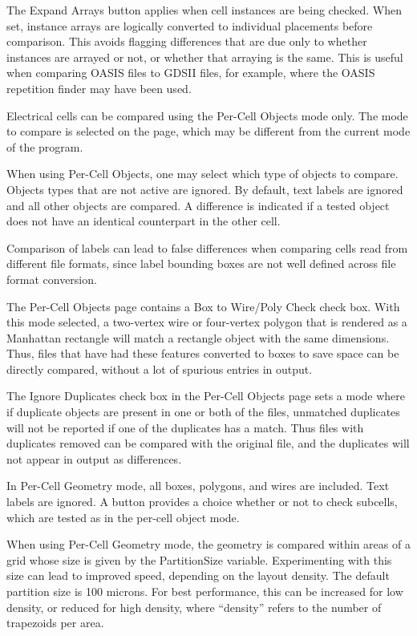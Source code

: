 The {\cb Expand Arrays} button applies when cell instances are being
checked.  When set, instance arrays are logically converted to
individual placements before comparison.  This avoids flagging
differences that are due only to whether instances are arrayed or not,
or whether that arraying is the same.  This is useful when comparing
OASIS files to GDSII files, for example, where the OASIS repetition
finder may have been used.

Electrical cells can be compared using the {\cb Per-Cell Objects} mode
only.  The mode to compare is selected on the page, which may be
different from the current mode of the program.

When using {\cb Per-Cell Objects}, one may select which type of
objects to compare.  Objects types that are not active are ignored. 
By default, text labels are ignored and all other objects are
compared.  A difference is indicated if a tested object does not have
an identical counterpart in the other cell.

Comparison of labels can lead to false differences when comparing
cells read from different file formats, since label bounding boxes are
not well defined across file format conversion.

The {\cb Per-Cell Objects} page contains a {\cb Box to Wire/Poly
Check} check box.  With this mode selected, a two-vertex wire or
four-vertex polygon that is rendered as a Manhattan rectangle will
match a rectangle object with the same dimensions.  Thus, files that
have had these features converted to boxes to save space can be
directly compared, without a lot of spurious entries in output.

The {\cb Ignore Duplicates} check box in the {\cb Per-Cell Objects}
page sets a mode where if duplicate objects are present in one or both
of the files, unmatched duplicates will not be reported if one of the
duplicates has a match.  Thus files with duplicates removed can be
compared with the original file, and the duplicates will not appear in
output as differences.

In {\cb Per-Cell Geometry} mode, all boxes, polygons, and wires are
included.  Text labels are ignored.  A button provides a choice
whether or not to check subcells, which are tested as in the per-cell
object mode.

When using {\cb Per-Cell Geometry} mode, the geometry is compared
within areas of a grid whose size is given by the {\et PartitionSize}
variable.  Experimenting with this size can lead to improved speed,
depending on the layout density.  The default partition size is 100
microns.  For best performance, this can be increased for low density,
or reduced for high density, where ``density'' refers to the number of
trapezoids per area.

